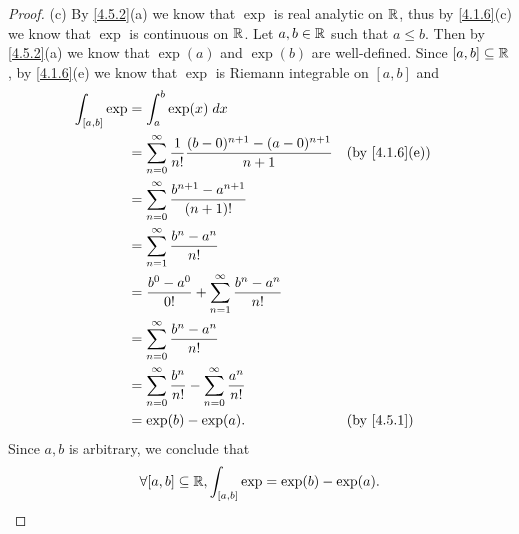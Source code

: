 \begin{proof}{(c)}
  By \cref{4.5.2}(a) we know that \(\exp\) is real analytic on \(\mathbb{R}\), thus by \cref{4.1.6}(c) we know that \(\exp\) is continuous on \(\mathbb{R}\).
  Let \(a, b \in \mathbb{R}\) such that \(a \leq b\).
  Then by \cref{4.5.2}(a) we know that \(\exp(a)\) and \(\exp(b)\) are well-defined.
  Since \([a, b] \subseteq \mathbb{R}\), by \cref{4.1.6}(e) we know that \(\exp\) is Riemann integrable on \([a, b]\) and
  \begin{align*}
    \int_{[a, b]} \exp & = \int_a^b \exp(x) \; dx                                                                                              \\
                       & = \sum_{n = 0}^\infty \dfrac{1}{n!} \dfrac{(b - 0)^{n + 1} - (a - 0)^{n + 1}}{n + 1} &  & \text{(by \cref{4.1.6}(e))} \\
                       & = \sum_{n = 0}^\infty \dfrac{b^{n + 1} - a^{n + 1}}{(n + 1)!}                                                         \\
                       & = \sum_{n = 1}^\infty \dfrac{b^n - a^n}{n!}                                                                           \\
                       & = \dfrac{b^0 - a^0}{0!} + \sum_{n = 1}^\infty \dfrac{b^n - a^n}{n!}                                                   \\
                       & = \sum_{n = 0}^\infty \dfrac{b^n - a^n}{n!}                                                                           \\
                       & = \sum_{n = 0}^\infty \dfrac{b^n}{n!} - \sum_{n = 0}^\infty \dfrac{a^n}{n!}                                           \\
                       & = \exp(b) - \exp(a).                                                                 &  & \by{4.5.1}
  \end{align*}
  Since \(a, b\) is arbitrary, we conclude that
  \[
    \forall [a, b] \subseteq \mathbb{R}, \int_{[a, b]} \exp = \exp(b) - \exp(a).
  \]
\end{proof}

